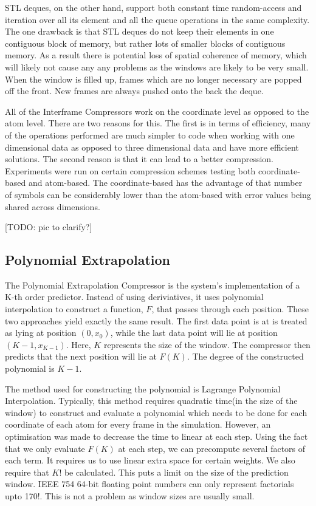 \documentclass[a4paper,11pt]{report}
\begin{document}
STL deques, on the other hand, support both constant time random-access and iteration over all its element and all the queue operations in the same complexity. The one drawback is that STL deques do not keep their elements in one contiguous block of memory, but rather lots of smaller blocks of contiguous memory. As a result there is potential loss of spatial coherence of memory, which will likely not cause any any problems as the windows are likely to be very small. When the window is filled up, frames which are no longer necessary are popped off the front. New frames are always pushed onto the back the deque.

All of the Interframe Compressors work on the coordinate level as opposed to the atom level. There are two reasons for this. The first is in terms of efficiency, many of the operations performed are much simpler to code when working with one dimensional data as opposed to three dimensional data and have more efficient solutions. The second reason is that it can lead to a better compression. Experiments were run on certain compression schemes testing both coordinate-based and atom-based. The coordinate-based has the advantage of that number of symbols can be considerably lower than the atom-based with error values being shared across dimensions.

[TODO: pic to clarify?]

\subsection{Polynomial Extrapolation}

The Polynomial Extrapolation Compressor is the system's implementation of a K-th order predictor. Instead of using deriviatives, it uses polynomial interpolation to construct a function, $F$, that passes through each position. These two approaches yield exactly the same result. The first data point is at is treated as lying at position $(0, x_0)$, while the last data point will lie at position $(K-1, x_{K-1})$. Here, $K$ represents the size of the window.  The compressor then predicts that the next position will lie at $F(K)$. The degree of the constructed polynomial is $K-1$.

The method used for constructing the polynomial is Lagrange Polynomial Interpolation. Typically, this method requires quadratic time(in the size of the window) to construct and evaluate a polynomial which needs to be done for each coordinate of each atom for every frame in the simulation. However, an optimisation was made to decrease the time to linear at each step. Using the fact that we only evaluate $F(K)$ at each step, we can precompute several factors of each term. It requires us to use linear extra space for certain weights. We also require that $K!$ be calculated. This puts a limit on the size of the prediction window. IEEE 754 64-bit floating point numbers can only represent factorials upto 170!. This is not a problem as window sizes are usually small.
\end{document}
